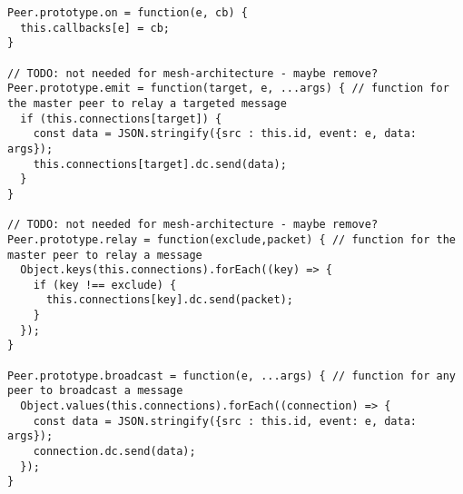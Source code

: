 \begin{singlespace}
\begin{lstlisting}[]
Peer.prototype.on = function(e, cb) {
  this.callbacks[e] = cb;
}

// TODO: not needed for mesh-architecture - maybe remove?
Peer.prototype.emit = function(target, e, ...args) { // function for the master peer to relay a targeted message
  if (this.connections[target]) {
    const data = JSON.stringify({src : this.id, event: e, data: args});
    this.connections[target].dc.send(data);
  }
}

// TODO: not needed for mesh-architecture - maybe remove?
Peer.prototype.relay = function(exclude,packet) { // function for the master peer to relay a message
  Object.keys(this.connections).forEach((key) => {
    if (key !== exclude) {
      this.connections[key].dc.send(packet);
    }
  });
}

Peer.prototype.broadcast = function(e, ...args) { // function for any peer to broadcast a message
  Object.values(this.connections).forEach((connection) => {
    const data = JSON.stringify({src : this.id, event: e, data: args});
    connection.dc.send(data);
  });
}
\end{lstlisting}
\end{singlespace}

